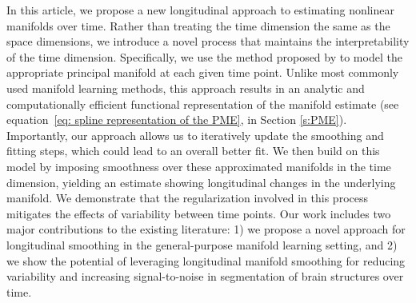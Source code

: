 \documentclass[12pt]{article}
\theoremstyle{definition}
\begin{document}
In this article, we propose a new longitudinal approach to estimating nonlinear manifolds over time. Rather than treating the time dimension the same as the space dimensions, we introduce a novel process that maintains the interpretability of the time dimension. Specifically, we use the method proposed by \cite{mengPrincipalManifoldEstimation2021} to model the appropriate principal manifold at each given time point. Unlike most commonly used manifold learning methods, this approach results in an analytic and computationally efficient functional representation of the manifold estimate (see equation~\eqref{eq: spline representation of the PME}, in Section \ref{s:PME}). Importantly, our approach allows us to iteratively update the smoothing and fitting steps, which could lead to an overall better fit. We then build on this model by imposing smoothness over these approximated manifolds in the time dimension, yielding an estimate showing longitudinal changes in the underlying manifold. We demonstrate that the regularization involved in this process mitigates the effects of variability between time points. Our work includes two major contributions to the existing literature: 1) we propose a novel approach for longitudinal smoothing in the general-purpose manifold learning setting, and 2) we show the potential of leveraging longitudinal manifold smoothing for reducing variability and increasing signal-to-noise in segmentation of brain structures over time. 

\end{document}
